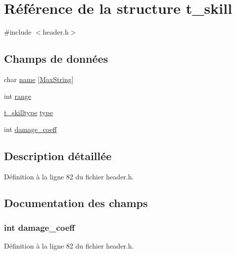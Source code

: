 \hypertarget{structt__skill}{\section{Référence de la structure t\-\_\-skill}
\label{structt__skill}
}


{\ttfamily \#include $<$header.\-h$>$}

\subsection*{Champs de données}
\begin{DoxyCompactItemize}
\item 
char \hyperlink{structt__skill_ab27f28c5ead39031421706ddbbd1edea}{name} \mbox{[}\hyperlink{header_8h_ab154998a3a376095f3601bc35c5cf523}{Max\-String}\mbox{]}
\item 
int \hyperlink{structt__skill_a037e8e370380046bec287bdc96942091}{range}
\item 
\hyperlink{header_8h_a440f669d36bc2028077af38574051204}{t\-\_\-skilltype} \hyperlink{structt__skill_ac00edc3c188c78c47878a357ecff2954}{type}
\item 
int \hyperlink{structt__skill_a9518a5f7d916a01def3588da5dc0c8fa}{damage\-\_\-coeff}
\end{DoxyCompactItemize}


\subsection{Description détaillée}


Définition à la ligne 82 du fichier header.\-h.



\subsection{Documentation des champs}
\hypertarget{structt__skill_a9518a5f7d916a01def3588da5dc0c8fa}{
\subsubsection[{damage\-\_\-coeff}]{\setlength{\rightskip}{0pt plus 5cm}int damage\-\_\-coeff}}\label{structt__skill_a9518a5f7d916a01def3588da5dc0c8fa}


Définition à la ligne 82 du fichier header.\-h.

